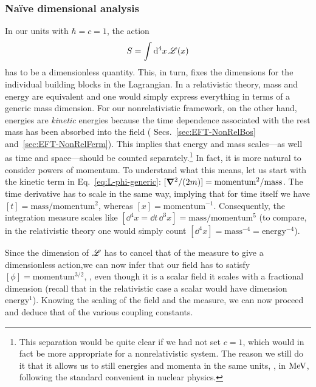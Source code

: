 \subsubsection{Na\"ive dimensional analysis}

In our units with $\hbar = c = 1$, the action
%
\begin{equation}
 S = \int \mathrm{d}^4 x\, \mathcal{L}(x)
\end{equation}
%
has to be a dimensionless quantity.  This, in turn, fixes the dimensions for 
the individual building blocks in the Lagrangian.  In a relativistic theory,  
mass and energy are equivalent and one would simply express everything in terms 
of a generic mass dimension.  For our nonrelativistic framework, on the other 
hand, energies are \emph{kinetic} energies because the time dependence 
associated with the rest mass has been absorbed into the field (\cf 
Secs.~\ref{sec:EFT-NonRelBos} and~\ref{sec:EFT-NonRelFerm}).  This implies 
that energy and mass scales---as well as time and space---should be counted 
separately.\footnote{This separation would be quite clear if we had not set 
$c=1$, which would in fact be more appropriate for a nonrelativistic system.  
The reason we still do it that it allows us to still energies and momenta in the 
same units, \eg, in $\mathrm{MeV}$, following the standard convenient in nuclear 
physics.}  In fact, it is more natural to consider powers of momentum.  To 
understand what this means, let us start with the kinetic term in 
Eq.~\eqref{eq:L-phi-generic}: $[\boldsymbol{\nabla}^2/(2m)] = 
\text{momentum}^2/\text{mass}$.  The time derivative has to scale in the same 
way, implying that for time itself we have $[t] = 
\text{mass}/\text{momentum}^2$, whereas $[x] = \text{momentum}^{-1}$.  
Consequently, the integration measure scales like $[\dd^4 x = \dd t\,\dd^3x] = 
\text{mass}/\text{momentum}^5$ (to compare, in the relativistic theory one 
would simply count $[\dd^4 x] = \text{mass}^{-4} = \text{energy}^{-4}$).

Since the dimension of $\mathcal{L}$ has to cancel that of the measure to give a 
dimensionless action,we can now infer that our field has to satisfy $[\phi] = 
\text{momentum}^{3/2}$, \ie, even though it is a scalar field it scales with a 
fractional dimension (recall that in the relativistic case a scalar would have 
dimension $\text{energy}^1$).  Knowing the scaling of the field and the 
measure, we can now proceed and deduce that of the various coupling constants.


